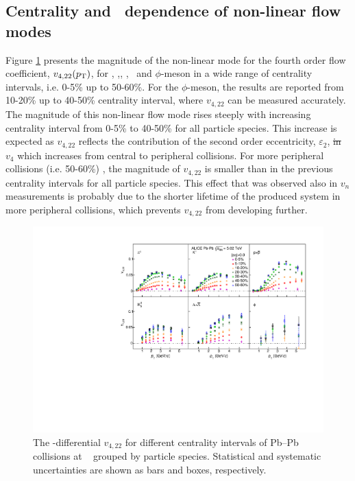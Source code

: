 \documentclass[ALICE,manyauthors]{cernphprep}
\providecommand{\DIFaddtex}[1]{{\protect\color{blue}\uwave{#1}}} %
\providecommand{\DIFdeltex}[1]{{\protect\color{red}\sout{#1}}}                      %
\providecommand{\DIFaddbegin}{} %
\providecommand{\DIFaddend}{} %
\providecommand{\DIFdelbegin}{} %
\providecommand{\DIFdelend}{} %
\providecommand{\DIFadd}[1]{\texorpdfstring{\DIFaddtex{#1}}{#1}} %
\providecommand{\DIFdel}[1]{\texorpdfstring{\DIFdeltex{#1}}{}} %
\newcommand{\DIFscaledelfig}{0.5}
\newlength{\DIFdelgraphicswidth} %
\newlength{\DIFdelgraphicsheight} %
\newcommand{\DIFaddincludegraphics}[2][]{{\color{blue}\fbox{\DIFOincludegraphics[#1]{#2}}}} %
\newcommand{\DIFdelincludegraphics}[2][]{%
\sbox{\DIFdelgraphicsbox}{\DIFOincludegraphics[#1]{#2}}%
\settoboxwidth{\DIFdelgraphicswidth}{\DIFdelgraphicsbox} %
\settoboxtotalheight{\DIFdelgraphicsheight}{\DIFdelgraphicsbox} %
\scalebox{\DIFscaledelfig}{%
\parbox[b]{\DIFdelgraphicswidth}{\usebox{\DIFdelgraphicsbox}\\[-\baselineskip] \rule{\DIFdelgraphicswidth}{0em}}\llap{\resizebox{\DIFdelgraphicswidth}{\DIFdelgraphicsheight}{%
\setlength{\unitlength}{\DIFdelgraphicswidth}%
\begin{picture}(1,1)%
\thicklines\linethickness{2pt} %
{\color[rgb]{1,0,0}\put(0,0){\framebox(1,1){}}}%
{\color[rgb]{1,0,0}\put(0,0){\line( 1,1){1}}}%
{\color[rgb]{1,0,0}\put(0,1){\line(1,-1){1}}}%
\end{picture}%
}\hspace*{3pt}}} %
} %
\DeclareRobustCommand{\DIFaddbegin}{\DIFOaddbegin \let\includegraphics\DIFaddincludegraphics} %
\DeclareRobustCommand{\DIFaddend}{\DIFOaddend \let\includegraphics\DIFOincludegraphics} %
\DeclareRobustCommand{\DIFdelbegin}{\DIFOdelbegin \let\includegraphics\DIFdelincludegraphics} %
\DeclareRobustCommand{\DIFdelend}{\DIFOaddend \let\includegraphics\DIFOincludegraphics} %
\begin{document}

\subsection{Centrality and \pT~dependence of non-linear flow modes}
\label{SubSec:pTdependence}

Figure \ref{v422_centralityDependence} presents the magnitude of the non-linear mode for the fourth order flow coefficient, $v_{4,22}(p_{\rm{T}})$, for \pion, \kaon,\Ks, \proton, \lambdas~and $\phi$-meson in a wide range of centrality intervals, i.e. 0-5\% up to 50-60\%. For the $\phi$-meson, the results are reported from 10-20\% up to 40-50\% centrality interval, where $v_{4,22}$ can be measured accurately. The magnitude of this non-linear flow mode rises steeply with increasing centrality interval from 0-5\% to 40-50\% for all particle species. This increase is expected as $v_{4,22}$ reflects the contribution of the second order eccentricity, $\varepsilon_{2}$, \DIFdelbegin \DIFdel{in $v_{4}$ }\DIFdelend which increases from central to peripheral collisions\DIFaddbegin \DIFadd{, in $v_{4}$ }\DIFaddend \cite{Alver:2010gr, Acharya:2017zfg}. For more peripheral collisions (i.e. 50-60\%) , the magnitude of $v_{4,22}$ is smaller than in the previous centrality intervals for all particle species. This effect that was observed also in $v_n$ measurements is probably due to the shorter lifetime of the produced system in more peripheral collisions, which prevents $v_{4,22}$ from developing further. 


\begin{figure}[!htb]
\begin{center}
\includegraphics[scale=0.82]{figures/results/All_v422_gap00_CentDep_PID2.pdf}
\end{center}
\caption{The \pT-differential $v_{4,22}$ for different centrality intervals of Pb--Pb collisions at \sNN~ grouped by particle species. Statistical and systematic uncertainties are shown as bars and boxes, respectively.}
\label{v422_centralityDependence}
\end{figure}
\end{document}

